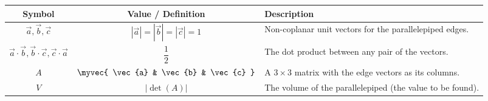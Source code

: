 \begin{tabular}{|c|c|p{5cm}|}
    \hline
    \textbf{Symbol} & \textbf{Value / Definition} & \textbf{Description}  \\
    \hline
    $\vec{a}, \vec{b}, \vec{c}$ & $|\vec{a}|=|\vec{b}|=|\vec{c}|=1$ & Non-coplanar unit vectors for the parallelepiped edges. \\
    \hline
    $\vec{a}\cdot\vec{b}, \vec{b}\cdot\vec{c}, \vec{c}\cdot\vec{a}$ & $\dfrac{1}{2}$ & The dot product between any pair of the vectors. \\
    \hline
    $A$ & $\myvec{ \vec{a} & \vec{b} & \vec{c} }$ & A $3\times3$ matrix with the edge vectors as its columns. \\
    \hline
    $V$ & $|\det(A)|$ & The volume of the parallelepiped (the value to be found). \\
    \hline
\end{tabular}